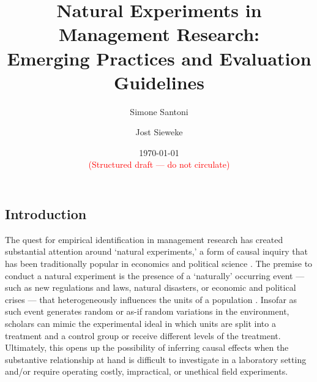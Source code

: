 \documentclass[nobib]{tufte-handout}
\title[Natural Experiments in Management Research]
{Natural Experiments in Management Research:\\Emerging Practices and 
Evaluation Guidelines\vspace{2em}}
\author[$\bullet\circ$]{Simone Santoni}
\author[$\star$]{Jost Sieweke}
\affil[$\bullet$]{Bayes Business School (formerly Cass)}
\affil[$\circ$]{Soundcloud}
\affil[$\star$]{Vrije Universiteit Amsterdam}
\date{\vspace{1em} \normalsize \today \vspace{1em} \\ 
      \textcolor{red}{(Structured draft --- do not circulate)}}
\begin{document}
\maketitle

%
%
%

\clearpage

\begin{refsection}

\section{Introduction}
\label{introduction}


The quest for empirical identification in management research has created
substantial attention around `natural experiments,' a form of causal inquiry
that has been traditionally popular in economics
\parencite[][]{Meyer1995,Rosenzweig2000} and political science
\parencite[][]{Dunning2008}.  The premise to conduct a natural experiment is the
presence of a `naturally' occurring event --- such as new regulations and laws,
natural disasters, or economic and political crises --- that heterogeneously
influences the units of a population \parencite[][]{Dunning2012,Robinson2009}.
Insofar as such event generates random or as-if random variations in the
environment, scholars can mimic the experimental ideal in which units are split
into a treatment and a control group or receive different levels of the
treatment. Ultimately, this opens up the possibility of inferring causal effects
when the substantive relationship at hand is difficult to investigate in a
laboratory setting and/or require operating costly, impractical, or unethical
field experiments.



\end{refsection}
\end{document}
